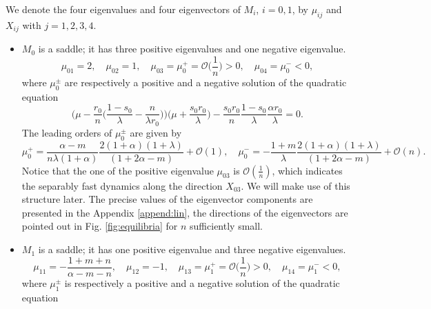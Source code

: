 \documentclass[a4paper,11pt]{article}
\def\BO{{\mathcal{O}}}
\theoremstyle{remark}
\begin{document}
We denote the four eigenvalues and four eigenvectors of $M_i$, $i=0,1$,  by $\mu_{ij}$ and $X_{ij}$ with $j=1,2,3,4$. %
\begin{itemize}
 \item $M_0$ is a saddle; it has three positive eigenvalues and one negative eigenvalue. 
 \begin{equation} \label{eq:eigM0}
  \mu_{01} = 2, \quad \mu_{02}=1, \quad \mu_{03}=\mu_0^+=\BO\Big(\frac{1}{n}\Big)>0, \quad \mu_{04}=\mu_0^{-}<0,
 \end{equation}
  where $\mu_0^\pm$ are respectively a positive and a negative solution of the quadratic equation
 $$ \Big(\mu - \frac{r_0}{n}\Big(\frac{1-s_0}{\lambda}-\frac{n}{\lambda r_0}\Big)\Big)\Big(\mu + \frac{s_0r_0}{\lambda}\Big) - \frac{s_0r_0}{n} \frac{1-s_0}{\lambda}\frac{\alpha r_0}{\lambda} = 0.$$
The leading orders of $\mu_0^\pm$ are given by
$$\mu_0^+ = \frac{\alpha-m}{n\lambda(1+\alpha)}\frac{2(1+\alpha)(1+\lambda)}{(1+2\alpha-m)}+\BO(1), \quad\mu_0^- = -\frac{1+m}{\lambda}\frac{2(1+\alpha)(1+\lambda)}{(1+2\alpha-m)}  + \BO(n).$$
Notice that the one of the positive eigenvalue $\mu_{03}$ is $\mathcal{O}( \frac{1}{n})$, which indicates the separably fast dynamics along the direction $X_{03}$. We will make use of this structure later.
The precise values of the eigenvector components are presented in the Appendix \ref{append:lin}, the directions of the eigenvectors are
pointed out in Fig. \ref{fig:equilibria} for $n$ sufficiently small.
 \item $M_1$ is a saddle; it has one positive eigenvalue and three negative eigenvalues. 
\begin{equation} \label{eq:eigM1}
 \mu_{11}=-\frac{1+m+n}{\alpha-m-n}, \quad \mu_{12}=-1, \quad \mu_{13}=\mu_1^+=\BO\Big(\frac{1}{n}\Big)>0, \quad \mu_{14}=\mu_1^{-}<0,
\end{equation}
where $\mu_1^\pm$ is respectively a positive and a negative solution of the quadratic equation

\end{itemize}
\end{document}
